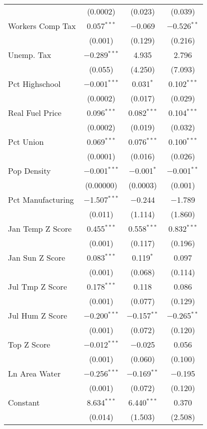 \begin{table}[!htbp]
\begin{tabular}{@{\extracolsep{5pt}}lccc}
  & (0.0002) & (0.023) & (0.039) \\ 
  Workers Comp Tax & 0.057$^{***}$ & $-$0.069 & $-$0.526$^{**}$ \\ 
  & (0.001) & (0.129) & (0.216) \\ 
  Unemp. Tax & $-$0.289$^{***}$ & 4.935 & 2.796 \\ 
  & (0.055) & (4.250) & (7.093) \\ 
  Pct Highschool & $-$0.001$^{***}$ & 0.031$^{*}$ & 0.102$^{***}$ \\ 
  & (0.0002) & (0.017) & (0.029) \\ 
  Real Fuel Price & 0.096$^{***}$ & 0.082$^{***}$ & 0.104$^{***}$ \\ 
  & (0.0002) & (0.019) & (0.032) \\ 
  Pct Union & 0.069$^{***}$ & 0.076$^{***}$ & 0.100$^{***}$ \\ 
  & (0.0001) & (0.016) & (0.026) \\ 
  Pop Density & $-$0.001$^{***}$ & $-$0.001$^{*}$ & $-$0.001$^{**}$ \\ 
  & (0.00000) & (0.0003) & (0.001) \\ 
  Pct Manufacturing & $-$1.507$^{***}$ & $-$0.244 & $-$1.789 \\ 
  & (0.011) & (1.114) & (1.860) \\ 
  Jan Temp Z Score & 0.455$^{***}$ & 0.558$^{***}$ & 0.832$^{***}$ \\ 
  & (0.001) & (0.117) & (0.196) \\ 
  Jan Sun Z Score & 0.083$^{***}$ & 0.119$^{*}$ & 0.097 \\ 
  & (0.001) & (0.068) & (0.114) \\ 
  Jul Tmp Z Score & 0.178$^{***}$ & 0.118 & 0.086 \\ 
  & (0.001) & (0.077) & (0.129) \\ 
  Jul Hum Z Score & $-$0.200$^{***}$ & $-$0.157$^{**}$ & $-$0.265$^{**}$ \\ 
  & (0.001) & (0.072) & (0.120) \\ 
  Top Z Score & $-$0.012$^{***}$ & $-$0.025 & 0.056 \\ 
  & (0.001) & (0.060) & (0.100) \\ 
  Ln Area Water & $-$0.256$^{***}$ & $-$0.169$^{**}$ & $-$0.195 \\ 
  & (0.001) & (0.072) & (0.120) \\ 
  Constant & 8.634$^{***}$ & 6.440$^{***}$ & 0.370 \\ 
  & (0.014) & (1.503) & (2.508) \\ 

\end{tabular}
\end{table}
